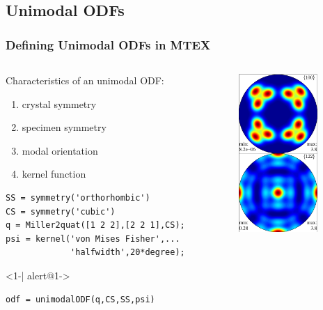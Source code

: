 \documentclass{beamer}
\newcommand{\MTEX}{{\bf {\color{red}M}TEX\,}}%
\begin{document}
\subsection*{Unimodal ODFs}

\begin{frame}[fragile]
  \frametitle{Defining Unimodal ODFs in \MTEX}

\begin{columns}   
    
  \begin{column}{8.5cm}
    
      Characteristics of an unimodal ODF:
      \begin{enumerate}
      \item crystal symmetry
      \item specimen symmetry
      \item modal orientation
      \item kernel function
      \end{enumerate}

  

\begin{lstlisting}
SS = symmetry('orthorhombic')
CS = symmetry('cubic')
q = Miller2quat([1 2 2],[2 2 1],CS);
psi = kernel('von Mises Fisher',...
             'halfwidth',20*degree);
\end{lstlisting}

      \begin{actionenv}<1-| alert@1->
\begin{lstlisting}
odf = unimodalODF(q,CS,SS,psi)
\end{lstlisting}
    \end{actionenv}

\end{column}
    
    \begin{column}{3cm}
      \includegraphics[width=3cm]{pic/unimodalODF}
    \end{column}
  \end{columns}
  
\end{frame}
\end{document}
